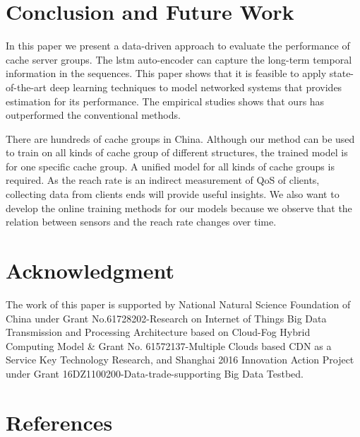 \documentclass[5p]{elsarticle}
\begin{document}
\section{Conclusion and Future Work}

In this paper we present a data-driven approach to evaluate the performance of cache server groups. The lstm auto-encoder can capture the long-term temporal information in the sequences. This paper shows that it is feasible to apply state-of-the-art deep learning techniques to model networked systems that provides estimation for its performance. The empirical studies shows that ours has outperformed the conventional methods.

There are hundreds of cache groups in China. Although our method can be used to train on all kinds of cache group of different structures, the trained model is for one specific cache group. A unified model for all kinds of cache groups is required. As the reach rate is an indirect measurement of QoS of clients, collecting data from clients ends will provide useful insights. We also want to develop the online training methods for our models because we observe that the relation between sensors and the reach rate changes over time.

\section{Acknowledgment}
The work of this paper is supported by National Natural Science Foundation of China under Grant No.61728202-Research on Internet of Things Big Data Transmission and Processing Architecture based on Cloud-Fog Hybrid Computing Model & Grant No. 61572137-Multiple Clouds based CDN as a Service Key Technology Research, and Shanghai 2016 Innovation Action Project under Grant 16DZ1100200-Data-trade-supporting Big Data Testbed.


\section*{References}


\end{document}
